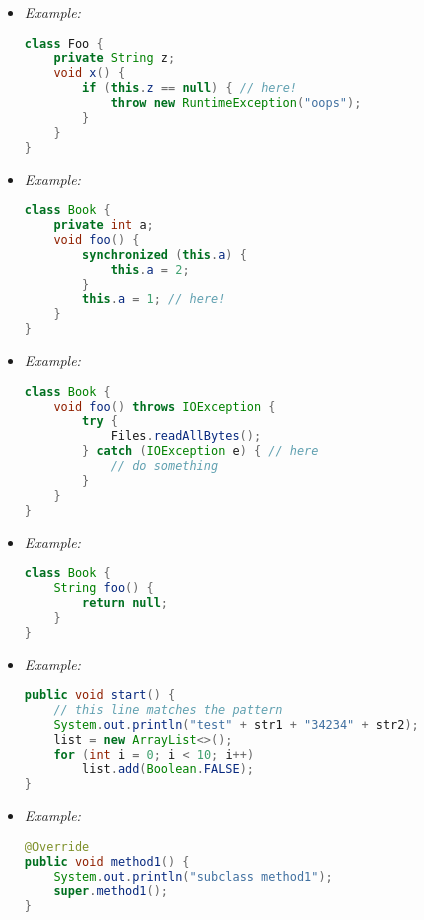 \begin{itemize}
	\item {}
{\it Example:}
\begin{lstlisting}[language=Java]
class Foo {
	private String z;
	void x() {
		if (this.z == null) { // here!
			throw new RuntimeException("oops");
		}
	}
}
\end{lstlisting}

	\item {}
{\it Example:}
\begin{lstlisting}[language=Java]
class Book {
	private int a;
	void foo() {
		synchronized (this.a) {
			this.a = 2;
		}
		this.a = 1; // here!
	}
}
\end{lstlisting}

	\item {}
{\it Example:}
\begin{lstlisting}[language=Java]
class Book {
	void foo() throws IOException {
		try {
			Files.readAllBytes();
		} catch (IOException e) { // here
			// do something
		}
	}
}
\end{lstlisting}

	\item {}
{\it Example:}
\begin{lstlisting}[language=Java]
class Book {
	String foo() {
		return null;
	}
}
\end{lstlisting}

	\item {}
{\it Example:}
\begin{lstlisting}[language=Java]
public void start() {
	// this line matches the pattern
	System.out.println("test" + str1 + "34234" + str2);
	list = new ArrayList<>();
	for (int i = 0; i < 10; i++)
		list.add(Boolean.FALSE);
}
\end{lstlisting}

	\item {}
{\it Example:}
\begin{lstlisting}[language=Java]
@Override
public void method1() {
	System.out.println("subclass method1");
	super.method1();
}
\end{lstlisting}


\end{itemize}
